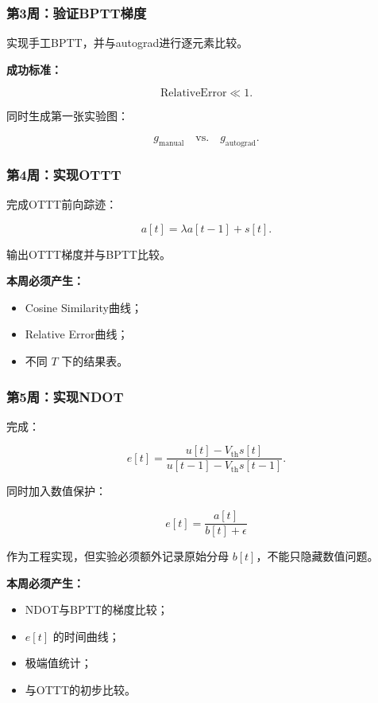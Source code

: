 \documentclass[journal,12pt,onecolumn]{IEEEtran}
\begin{document}
\subsubsection{第3周：验证BPTT梯度}

实现手工BPTT，并与autograd进行逐元素比较。

\textbf{成功标准：}

\[
\mathrm{RelativeError}
\ll 1.
\]

同时生成第一张实验图：

\[
g_{\mathrm{manual}}
\quad
\text{vs.}
\quad
g_{\mathrm{autograd}}.
\]

\subsubsection{第4周：实现OTTT}

完成OTTT前向踪迹：

\[
a[t]
=
\lambda a[t-1]+s[t].
\]

输出OTTT梯度并与BPTT比较。

\textbf{本周必须产生：}

\begin{itemize}
    \item Cosine Similarity曲线；
    \item Relative Error曲线；
    \item 不同 \(T\) 下的结果表。
\end{itemize}

\subsubsection{第5周：实现NDOT}

完成：

\[
e[t]
=
\frac{
u[t]-V_{\mathrm{th}}s[t]
}{
u[t-1]-V_{\mathrm{th}}s[t-1]
}.
\]

同时加入数值保护：

\[
e[t]
=
\frac{a[t]}{b[t]+\epsilon}
\]

作为工程实现，但实验必须额外记录原始分母 \(b[t]\)，不能只隐藏数值问题。

\textbf{本周必须产生：}

\begin{itemize}
    \item NDOT与BPTT的梯度比较；
    \item \(e[t]\) 的时间曲线；
    \item 极端值统计；
    \item 与OTTT的初步比较。
\end{itemize}
\end{document}
